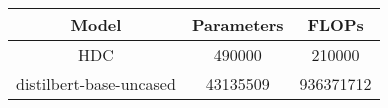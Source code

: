 \begin{tabular}{ccc}
\toprule
Model & Parameters & FLOPs \\
\midrule
HDC & 490000 & 210000 \\
distilbert-base-uncased & 43135509 & 936371712 \\
\bottomrule
\end{tabular}
